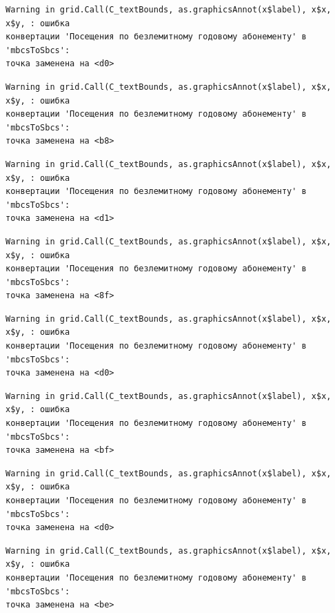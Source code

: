\documentclass[
  letterpaper,
  DIV=11,
  numbers=noendperiod]{scrreprt}
\begin{document}
\begin{verbatim}
Warning in grid.Call(C_textBounds, as.graphicsAnnot(x$label), x$x, x$y, : ошибка
конвертации 'Посещения по безлемитному годовому абонементу' в 'mbcsToSbcs':
точка заменена на <d0>
\end{verbatim}

\begin{verbatim}
Warning in grid.Call(C_textBounds, as.graphicsAnnot(x$label), x$x, x$y, : ошибка
конвертации 'Посещения по безлемитному годовому абонементу' в 'mbcsToSbcs':
точка заменена на <b8>
\end{verbatim}

\begin{verbatim}
Warning in grid.Call(C_textBounds, as.graphicsAnnot(x$label), x$x, x$y, : ошибка
конвертации 'Посещения по безлемитному годовому абонементу' в 'mbcsToSbcs':
точка заменена на <d1>
\end{verbatim}

\begin{verbatim}
Warning in grid.Call(C_textBounds, as.graphicsAnnot(x$label), x$x, x$y, : ошибка
конвертации 'Посещения по безлемитному годовому абонементу' в 'mbcsToSbcs':
точка заменена на <8f>
\end{verbatim}

\begin{verbatim}
Warning in grid.Call(C_textBounds, as.graphicsAnnot(x$label), x$x, x$y, : ошибка
конвертации 'Посещения по безлемитному годовому абонементу' в 'mbcsToSbcs':
точка заменена на <d0>
\end{verbatim}

\begin{verbatim}
Warning in grid.Call(C_textBounds, as.graphicsAnnot(x$label), x$x, x$y, : ошибка
конвертации 'Посещения по безлемитному годовому абонементу' в 'mbcsToSbcs':
точка заменена на <bf>
\end{verbatim}

\begin{verbatim}
Warning in grid.Call(C_textBounds, as.graphicsAnnot(x$label), x$x, x$y, : ошибка
конвертации 'Посещения по безлемитному годовому абонементу' в 'mbcsToSbcs':
точка заменена на <d0>
\end{verbatim}

\begin{verbatim}
Warning in grid.Call(C_textBounds, as.graphicsAnnot(x$label), x$x, x$y, : ошибка
конвертации 'Посещения по безлемитному годовому абонементу' в 'mbcsToSbcs':
точка заменена на <be>
\end{verbatim}
\end{document}

